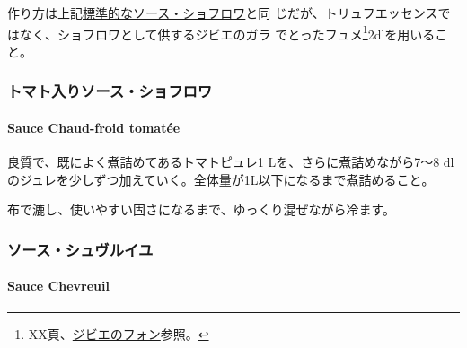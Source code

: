 \begin{recette}
  

作り方は上記\protect\hyperlink{sauce-chaud-froid-brune}{標準的なソース・ショフロワ}と同
じだが、トリュフエッセンスではなく、ショフロワとして供するジビエのガラ
でとったフュメ\footnote{XX頁、\protect\hyperlink{fonds-de-gibier}{ジビエのフォン}参照。}2dlを用いること。

\maeaki

\hypertarget{ux30c8ux30deux30c8ux5165ux308aux30bdux30fcux30b9ux30b7ux30e7ux30d5ux30edux30ef}{%
\subsubsection{トマト入りソース・ショフロワ}\label{ux30c8ux30deux30c8ux5165ux308aux30bdux30fcux30b9ux30b7ux30e7ux30d5ux30edux30ef}}

\hypertarget{sauce-chaud-froid-tomatee}{%
\paragraph{Sauce Chaud-froid tomatée}\label{sauce-chaud-froid-tomatee}}


良質で、既によく煮詰めてあるトマトピュレ1 Lを、さらに煮詰めながら7〜8
dlのジュレを少しずつ加えていく。全体量が1L以下になるまで煮詰めること。

布で漉し、使いやすい固さになるまで、ゆっくり混ぜながら冷ます。

\maeaki

\hypertarget{ux30bdux30fcux30b9ux30b7ux30e5ux30f4ux30ebux30a4ux30e6}{%
\subsubsection{ソース・シュヴルイユ}\label{ux30bdux30fcux30b9ux30b7ux30e5ux30f4ux30ebux30a4ux30e6}}

\hypertarget{sauce-chevreuil}{%
\paragraph{Sauce Chevreuil}\label{sauce-chevreuil}}


\end{recette}
